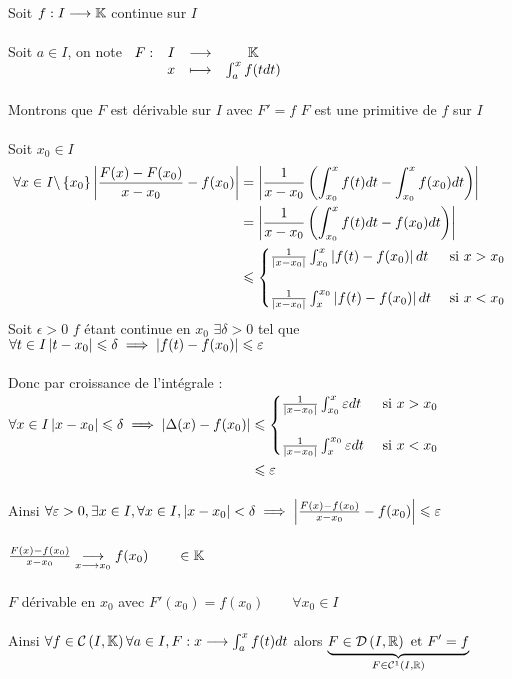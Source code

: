 \begin{dem}
    Soit \(f : I \longrightarrow \mathbb{K}\) continue sur \(I\)\\~\\
    Soit \(a \in I\), on note \(\begin{array}[t]{cccc}F : & I & \longrightarrow & \mathbb{K} \\ & x & \longmapsto & \int_a^x f(t dt)\end{array}\)\\~\\
    Montrons que \(F\) est dérivable sur \(I\) avec \(F' = f\) \cad \(F\) est une primitive de \(f\) sur \(I\)\\~\\
    Soit \(x_0 \in I\)
    \begin{align*}
        \forall x \in I\backslash \left\lbrace x_0\right\rbrace \left\lvert\frac{F(x) - F(x_0)}{x-x_0} - f(x_0)\right\rvert &= \left\lvert\frac{1}{x-x_0}\left(\int_{x_0}^x f(t)dt - \int_{x_0}^x f(x_0)dt\right)\right\rvert \\
        & = \left\lvert\frac{1}{x-x_0}\left(\int_{x_0}^x f(t)dt -  f(x_0)dt\right)\right\rvert\\
        & \leqslant \begin{cases}
            \frac{1}{\left\lvert x-x_0\right\rvert} \int_{x_0}^{x} \left\lvert f(t) - f(x_0)\right\rvert dt &\text{ si } x> x_0\\
            \\
            \frac{1}{\left\lvert x-x_0\right\rvert} \int_{x}^{x_0} \left\lvert f(t) - f(x_0)\right\rvert dt &\text{ si } x< x_0\\
        \end{cases} \\
    \end{align*}
    Soit \(\epsilon > 0\) \(f\) étant continue en \(x_0\) \(\exists \delta >0 \) tel que \(\forall t \in I \left\lvert t-x_0\right\rvert\leqslant\delta \implies \left\lvert f(t) - f(x_0)\right\rvert \leqslant \varepsilon\)\\~\\
    Donc par croissance de l'intégrale : \(\begin{aligned}\forall x  \in I \left\lvert x-x_0\right\rvert\leqslant \delta \implies \left\lvert\Delta(x)-f(x_0)\right\rvert&\leqslant \begin{cases}
            \frac{1}{\left\lvert x-x_0\right\rvert} \int_{x_0}^{x} \varepsilon dt &\text{ si } x> x_0\\
            \\
            \frac{1}{\left\lvert x-x_0\right\rvert} \int_{x}^{x_0} \varepsilon dt &\text{ si } x< x_0\\
        \end{cases}\\
        &\leqslant \varepsilon
    \end{aligned} \)\\~\\
    Ainsi \(\forall \varepsilon > 0, \exists x \in I, \forall x \in I, \left\lvert x-x_0\right\rvert< \delta \implies \left\lvert\frac{F(x)-f(x_0)}{x-x_0} - f(x_0)\right\rvert\leqslant \varepsilon\)\\~\\
    \ie \(\frac{F(x)-f(x_0)}{x-x_0} \underset{x\longrightarrow x_0}{\longrightarrow} f(x_0) \qquad \in \mathbb{K}\)\\~\\
    \ie \(F\) dérivable en \(x_0\) avec \(F'(x_0) = f(x_0) \qquad \forall x_0 \in I\)\\~\\
    Ainsi \(\forall f \in \mathcal{C}\left(I,\mathbb{K}\right) \forall a \in I, F : x \longrightarrow \int_a^x f(t) dt\) alors \(\underbrace{F \in \mathcal{D}\left(I,\mathbb{R}\right) \text{ et } F' = f}_{F\in \mathcal{C}^1\left(I,\mathbb{R}\right)}\) 
\end{dem}
